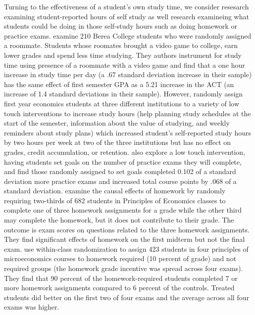 \documentclass[12pt]{article}
\begin{document}
Turning to the effectiveness of a student's own study time, we consider resesarch examining student-reported hours of self study as well research examineing what students could be doing in those self-study hours such as doing homework or practice exams.  \textcite{ss2008} examine 210 Berea College students who were randomly assigned a roommate. Students whose roomates brought a video game to college, earn lower grades and spend less time studying. They authors instrument for study time using presence of a roommate with a video game and find that a one hour increase in study time per day (a .67 standard deviation increase in their sample) has the same effect of first semester GPA as a 5.21 increase in the ACT (an increase of 1.4 standard deviations in their sample). \textcite{mbp2011} However, \textcite{oppp2019} randomly assign first year economics students at three different institutions to a variety of low touch interventions to increase study hours (help planning study schedules at the start of the semester, information about the value of studying, and weekly reminders about study plans) which increased student's self-reported study hours by two hours per week at two of the three institutions but has no effect on grades, credit accumulation, or retention. \textcite{cgpr2020} also explore a low touch intervention, having students set goals on the number of practice exams they will complete, and find those randomly assigned to set goals completed 0.102 of a standard deviation more practice exams and increased total course points by .068 of a standard deviation.  \textcite{ts2012} examine the causal effects of homework by randomly requiring two-thirds of 682 students in Principles of Economics classes to complete one of three homework assignments for a grade while the other third may complete the homework, but it does not contribute to their grade. The outcome is exam scores on questions related to the three homework assignments. They find significant effects of homework on the first midterm but not the final exam. \textcite{gr2013} use within-class randomization to assign 423 students in four principles of microeconomics courses to homework required (10 percent of grade) and not required groups (the homework grade incentive was spread across four exams).  They find that 90 percent of the homework-required students completed 7 or more homework assignments compared to 6 percent of the controls.  Treated students did better on the first two of four exams and the average across all four exams was higher.    
\end{document}
